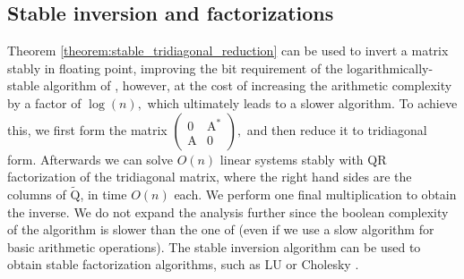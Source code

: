 \documentclass{article}
\newcommand\matA{\boldsymbol{\mathrm{A}}}
\newcommand\matQtilde{\widetilde{\boldsymbol{\mathrm{Q}}}}
\begin{document}
\subsection{Stable inversion and factorizations}
Theorem \ref{theorem:stable_tridiagonal_reduction} can be used to invert a matrix stably in floating point, improving the bit requirement of the logarithmically-stable algorithm of \cite{demmel2007fastla}, however, at the cost of increasing the arithmetic complexity by a factor of $\log(n),$ which ultimately leads to a slower algorithm. To achieve this, we first form the matrix $\begin{pmatrix}
    0 & \matA^* \\
    \matA & 0
\end{pmatrix},$ and then reduce it to tridiagonal form. Afterwards we can solve $O(n)$ linear systems stably with QR factorization of the tridiagonal matrix, where the right hand sides are the columns of $\matQtilde$, in time $O(n)$ each. We perform one final multiplication to obtain the inverse. We do not expand the analysis further since the boolean complexity of the algorithm is slower than the one of \cite{demmel2007fastla} (even if we use a slow algorithm for basic arithmetic operations).
The stable inversion algorithm can be used to obtain stable factorization algorithms, such as LU \cite{demmel2007fastla} or Cholesky \cite{sobczyk2024invariant}.
\end{document}
